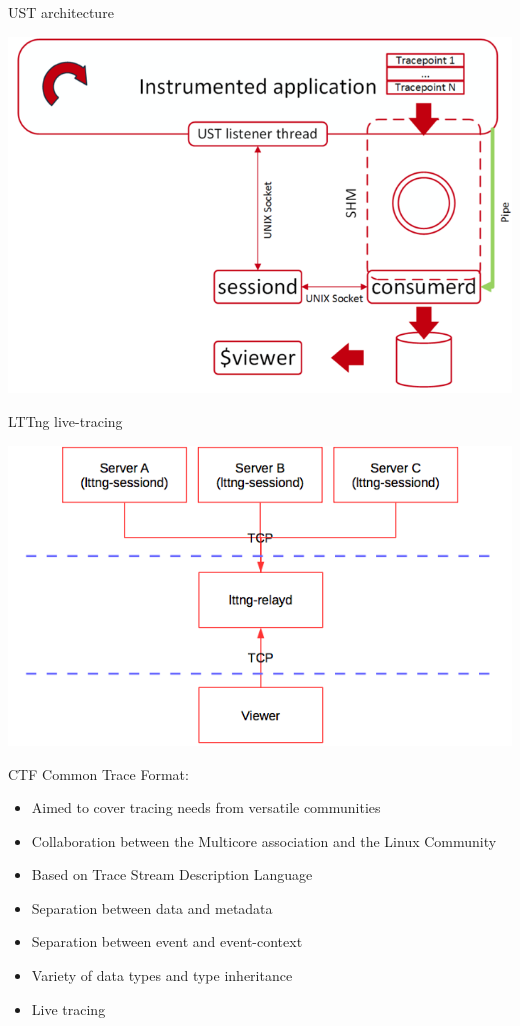 \begin{frame}{UST architecture}
\begin{center}
\includegraphics[scale=0.5]{images/ust-architecture.png}
\end{center}
\end{frame}

\begin{frame}{LTTng live-tracing}
\begin{center}
\includegraphics[scale=0.4]{images/relayd.png}
\end{center}
\end{frame}

\begin{frame}{CTF}
Common Trace Format:
\hfill \\
\begin{itemize}
\item Aimed to cover tracing needs from versatile communities
\item Collaboration between the Multicore association and the Linux Community
\item Based on Trace Stream Description Language
\item Separation between data and metadata
\item Separation between event and event-context
\item Variety of data types and type inheritance
\item Live tracing
\end{itemize}
\end{frame}

